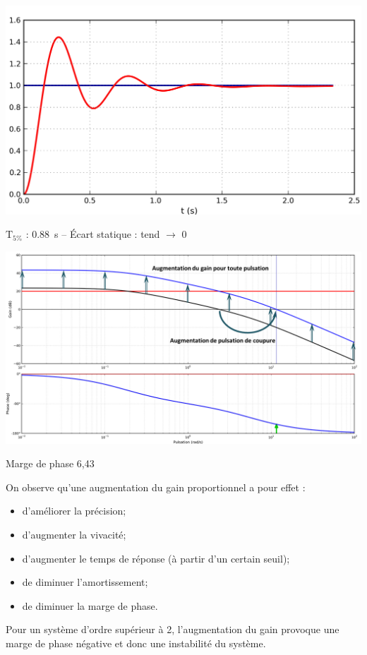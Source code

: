 \documentclass[10pt,fleqn]{article} %
\begin{document}
\noindent
\begin{minipage}[c]{.46\linewidth}
\begin{center}
\includegraphics[width=\linewidth]{images/fig_05a}

$\text{T}_{5\%}$ : \SI{0,88}{s} -- Écart statique : tend $\to$ 0
\end{center}

\end{minipage} \hfill
\begin{minipage}[c]{.46\linewidth}
\begin{center}
\includegraphics[width=\linewidth]{images/fig_05b}

Marge de phase 6,43 \degres
\end{center}
\end{minipage} 

\begin{resultat}

On observe qu'une augmentation du gain proportionnel a pour effet :
\begin{itemize}
\item d'améliorer la précision;
\item d'augmenter la vivacité;
\item d'augmenter le temps de réponse (à partir d'un certain seuil);
\item de diminuer l'amortissement;
\item de diminuer la marge de phase.
\end{itemize}
Pour un système d'ordre supérieur à 2, l'augmentation du gain provoque une marge de phase négative et donc une instabilité du système.
\end{resultat}
\end{document}

